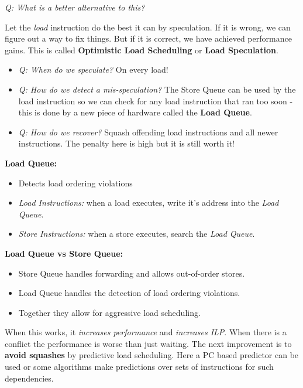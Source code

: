 \documentclass[12pt]{article}
\newenvironment{QandA}{\begin{enumerate}[label=\bfseries\arabic*.]\bfseries}
                      {\end{enumerate}}
\newenvironment{answered}{\par\quad\normalfont}{}
\begin{document}
\begin{QandA}
\begin{answered}
\textit{Q: What is a better alternative to this?}

\quad Let the \textit{load} instruction do the best it can by speculation. If it is wrong, we can figure out a way to fix things. But if it is correct, we have achieved performance gains. This is called \textbf{Optimistic Load Scheduling} or \textbf{Load Speculation}.

\begin{itemize}
    \item \textit{Q: When do we speculate?} On every load!
    \item \textit{Q: How do we detect a mis-speculation?} The Store Queue can be used by the load instruction so we can check for any load instruction that ran too soon - this is done by a new piece of hardware called the \textbf{Load Queue}. 
    \item \textit{Q: How do we recover?} Squash offending load instructions and all newer instructions. The penalty here is high but it is still worth it!
\end{itemize}

\textbf{Load Queue:}

\begin{itemize}
    \item Detects load ordering violations
    \item \textit{Load Instructions:} when a load executes, write it's address into the \textit{Load Queue}.
    \item \textit{Store Instructions:} when a store executes, search the \textit{Load Queue}. 
\end{itemize}

\textbf{Load Queue vs Store Queue:}
\begin{itemize}
    \item Store Queue handles forwarding and allows out-of-order stores.
    \item Load Queue handles the detection of load ordering violations.
    \item Together they allow for aggressive load scheduling.
\end{itemize}

When this works, it \textit{increases performance} and \textit{increases ILP}. When there is a conflict the performance is worse than just waiting. The next improvement is to \textbf{avoid squashes} by predictive load scheduling. Here a PC based predictor can be used or some algorithms make predictions over sets of instructions for such dependencies. 


\end{answered}


\end{QandA}
\end{document}
